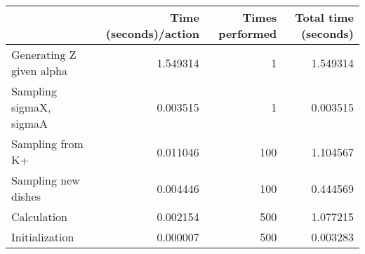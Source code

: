 \begin{tabular}{lrrr}
\toprule
{} &  Time (seconds)/action &  Times performed &  Total time (seconds) \\
\midrule
Generating Z given alpha &               1.549314 &                1 &              1.549314 \\
Sampling sigmaX, sigmaA  &               0.003515 &                1 &              0.003515 \\
Sampling from K+         &               0.011046 &              100 &              1.104567 \\
Sampling new dishes      &               0.004446 &              100 &              0.444569 \\
Calculation              &               0.002154 &              500 &              1.077215 \\
Initialization           &               0.000007 &              500 &              0.003283 \\
\bottomrule
\end{tabular}
